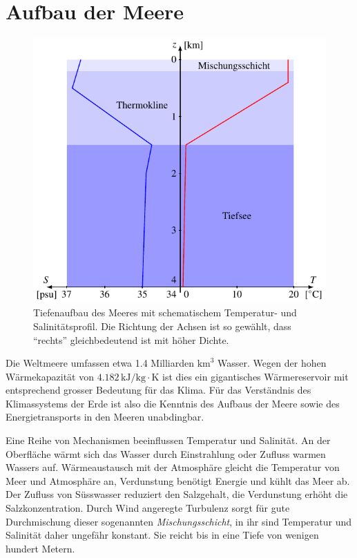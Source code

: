%
%
%
\section{Aufbau der Meere\label{section:thc:schichtung}}
\begin{figure}
\centering
\includegraphics{chapters/4/schichten.pdf}
\caption{Tiefenaufbau des Meeres mit schematischem
Temperatur- und Salinitätsprofil.
Die Richtung der Achsen ist so gewählt, dass ``rechts'' gleichbedeutend
ist mit höher Dichte.
\label{skript:thc:schichtung}}
\end{figure}
Die Weltmeere umfassen etwa 1.4 Milliarden $\text{km}^3$ Wasser.
Wegen der hohen Wärmekapazität von $4.182\,\text{kJ}/\text{kg}\cdot\text{K}$
ist dies ein gigantisches Wärmereservoir mit entsprechend grosser
Bedeutung für das Klima.
Für das Verständnis des Klimassystems der Erde ist also die Kenntnis
des Aufbaus der Meere sowie des Energietransports in den Meeren unabdingbar.

Eine Reihe von Mechanismen beeinflussen Temperatur und Salinität.
An der Oberfläche wärmt sich das Wasser durch Einstrahlung
oder Zufluss warmen Wassers auf.
Wärmeaustausch mit der Atmosphäre gleicht die Temperatur von
Meer und Atmosphäre an, Verdunstung benötigt Energie und kühlt das Meer ab.
Der Zufluss von Süsswasser reduziert den Salzgehalt, die Verdunstung erhöht
die Salzkonzentration.
Durch Wind angeregte Turbulenz sorgt für gute Durchmischung dieser 
sogenannten {\em Mischungsschicht},
%
in ihr sind Temperatur und Salinität daher ungefähr konstant.
Sie reicht bis in eine Tiefe von wenigen hundert Metern.


